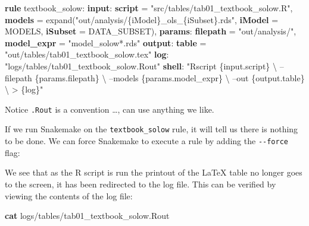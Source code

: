 \documentclass[]{book}
\newenvironment{Shaded}{\begin{snugshade}}{\end{snugshade}}
\newcommand{\KeywordTok}[1]{\textcolor[rgb]{0.13,0.29,0.53}{\textbf{{#1}}}}
\newcommand{\StringTok}[1]{\textcolor[rgb]{0.31,0.60,0.02}{{#1}}}
\newcommand{\NormalTok}[1]{{#1}}
\theoremstyle{definition}
\theoremstyle{definition}
\theoremstyle{definition}
\theoremstyle{remark}
\begin{document}
\begin{Shaded}
\begin{Highlighting}[]
\KeywordTok{rule} \NormalTok{textbook_solow:}
    \KeywordTok{input}\NormalTok{:}
        \KeywordTok{script} \NormalTok{= }\StringTok{"src/tables/tab01_textbook_solow.R"}\NormalTok{,}
        \KeywordTok{models} \NormalTok{= expand(}\StringTok{"out/analysis/\{iModel\}_ols_\{iSubset\}.rds"}\NormalTok{,}
                            \KeywordTok{iModel} \NormalTok{= MODELS,}
                            \KeywordTok{iSubset} \NormalTok{= DATA_SUBSET),}
    \KeywordTok{params}\NormalTok{:}
        \KeywordTok{filepath}   \NormalTok{= }\StringTok{"out/analysis/"}\NormalTok{,}
        \KeywordTok{model_expr} \NormalTok{= }\StringTok{"model_solow*.rds"}
    \KeywordTok{output}\NormalTok{:}
        \KeywordTok{table} \NormalTok{= }\StringTok{"out/tables/tab01_textbook_solow.tex"}
    \KeywordTok{log}\NormalTok{:}
        \StringTok{"logs/tables/tab01_textbook_solow.Rout"}
    \KeywordTok{shell}\NormalTok{:}
        \StringTok{"Rscript \{input.script\} \textbackslash{}}
\StringTok{            --filepath \{params.filepath\} \textbackslash{}}
\StringTok{            --models \{params.model_expr\} \textbackslash{}}
\StringTok{            --out \{output.table\} \textbackslash{}}
\StringTok{            > \{log\}"}
\end{Highlighting}
\end{Shaded}

Notice \texttt{.Rout} is a convention \ldots{}, can use anything we
like.

If we run Snakemake on the \texttt{textbook\_solow} rule, it will tell
us there is nothing to be done. We can force Snakemake to execute a rule
by adding the \texttt{-\/-force} flag:

\begin{Shaded}
\end{Shaded}

We see that as the R script is run the printout of the LaTeX table no
longer goes to the screen, it has been redirected to the log file. This
can be verified by viewing the contents of the log file:

\begin{Shaded}
\begin{Highlighting}[]
\KeywordTok{cat} \NormalTok{logs/tables/tab01_textbook_solow.Rout}
\end{Highlighting}
\end{Shaded}
\end{document}
